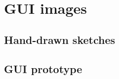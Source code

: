 \chapter{GUI images}
\label{Appendix_GUI}

\section{Hand-drawn sketches}
\label{Appendix_GUI_sketches}

\section{GUI prototype}
\label{Appendix_GUI_Prototype}